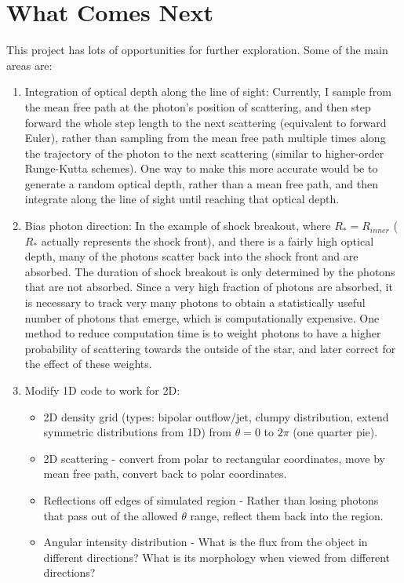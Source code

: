 \documentclass{amsart}
\begin{document}
\section{What Comes Next}
This project has lots of opportunities for further exploration.  Some of the main areas are:
\begin{enumerate}
\item Integration of optical depth along the line of sight:
Currently, I sample from the mean free path at the photon's position of scattering, and then step forward the whole step length to the next scattering (equivalent to forward Euler), rather than sampling from the mean free path multiple times along the trajectory of the photon to the next scattering (similar to higher-order Runge-Kutta schemes).  One way to make this more accurate would be to generate a random optical depth, rather than a mean free path, and then integrate along the line of sight until reaching that optical depth.
\item Bias photon direction: In the example of shock breakout, where $R_*=R_{inner}$ ($R_*$ actually represents the shock front), and there is a fairly high optical depth, many of the photons scatter back into the shock front and are absorbed.  The duration of shock breakout is only determined by the photons that are not absorbed.  Since a very high fraction of photons are absorbed, it is necessary to track very many photons to obtain a statistically useful number of photons that emerge, which is computationally expensive.  One method to reduce computation time is to weight photons to have a higher probability of scattering towards the outside of the star, and later correct for the effect of these weights.
\item Modify 1D code to work for 2D:
\begin{itemize}
\item 2D density grid (types: bipolar outflow/jet, clumpy distribution, extend symmetric distributions from 1D) from $\theta=0$ to $2\pi$ (one quarter pie).
\item 2D scattering - convert from polar to rectangular coordinates, move by mean free path, convert back to polar coordinates.
\item Reflections off edges of simulated region - Rather than losing photons that pass out of the allowed $\theta$ range, reflect them back into the region.
\item Angular intensity distribution - What is the flux from the object in different directions?  What is its morphology when viewed from different directions?
\end{itemize}

\end{enumerate}
\end{document}
